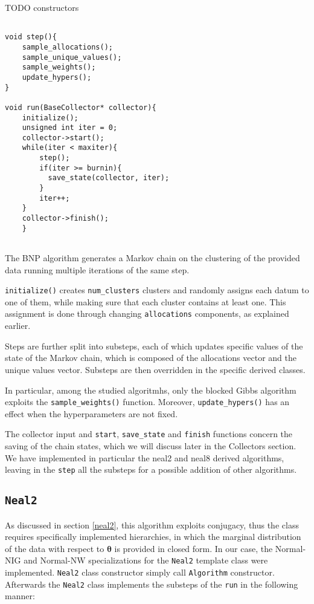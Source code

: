 TODO constructors

\begin{verbatim}

void step(){
    sample_allocations();
    sample_unique_values();
    sample_weights();
    update_hypers();
}

void run(BaseCollector* collector){
    initialize();
    unsigned int iter = 0;
    collector->start();
    while(iter < maxiter){
        step();
        if(iter >= burnin){
          save_state(collector, iter);
        }
        iter++;
    }
    collector->finish();
    }
    
\end{verbatim}

The BNP algorithm generates a Markov chain on the clustering of the provided data running multiple iterations of the same step.

\verb|initialize()| creates \verb|num_clusters| clusters and randomly assigns each datum to one of them, while making sure that each cluster contains at least one.
	This assignment is done through changing \verb|allocations| components, as explained earlier.

Steps are further split into substeps, each of which updates specific values of the state of the Markov chain, which is composed of the allocations vector and the unique values vector. Substeps are then overridden in the specific derived classes.

In particular, among the studied algoritmhs, only the blocked Gibbs algorithm exploits the \verb|sample_weights()| function. Moreover, \verb|update_hypers()| has an effect  when the hyperparameters are not fixed.

The collector input and \verb|start|, \verb|save_state| and \verb|finish| functions concern the saving of the chain states, which we will discuss later in the Collectors section.
We have implemented in particular the neal2 and neal8 derived algorithms, leaving in the \verb|step| all the substeps for a possible addition of other algorithms.




\subsection{\texttt{Neal2}}

As discussed in section \ref{neal2}, this algorithm exploits conjugacy, thus the class requires specifically implemented hierarchies, in which the marginal distribution of the data with respect to $\boldsymbol\theta$ is provided in closed form.
In our case, the Normal-NIG and Normal-NW specializations for the \verb|Neal2| template class were implemented.
\verb|Neal2| class constructor simply call \verb|Algorithm| constructor.
Afterwards the \verb|Neal2| class implements the substeps of the \verb|run| in the following manner:

